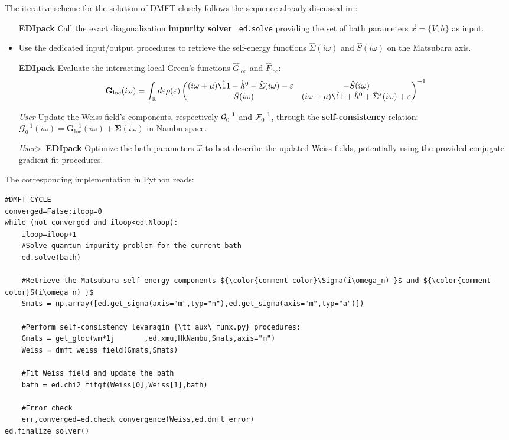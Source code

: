 \documentclass[edipack_sp.tex]{subfiles}
\begin{document}
The iterative scheme for the solution of DMFT closely follows the
sequence already discussed in :   
\begin{itemize}
\item[{\tiny {\bf EDIpack}}] Call the exact diagonalization {\bf impurity solver} {\tt
    ed.solve} providing the set of bath parameters $\vec{x}=\{V,h\}$  as input. 

\item Use the dedicated
  input/output \NAME procedures to retrieve the self-energy functions  
  $\hat{\Sigma}(i\omega)$ and $\hat{S}(i\omega)$ on the 
  Matsubara axis.
  
\item[{\tiny {\bf EDIpack}}]
  Evaluate the interacting local Green's functions $\hat{G}_\mathrm{loc}$ and
  $\hat{F}_\mathrm{loc}$:
  \begin{equation}
  {\mathbf G}_\mathrm{loc}(i\omega) =
  \int_\RRR d\e \rho(\e)
  \begin{pmatrix}
    (i\omega +\mu)\hat{\11} - \hat{h}^0 - \hat{\Sigma}(i\omega) -\e & -\hat{S}(i\omega) \\
    -\hat{S}(i\omega) & (i\omega +\mu)\hat{\11} + \hat{h}^0 +
    \hat{\Sigma}^*(i\omega) +\e\\
  \end{pmatrix}^{-1}
\end{equation}

\item[{\tiny {\it User}}] Update the Weiss field's components, respectively 
  ${\cal G}_0^{-1}$ and ${\cal F}_0^{-1}$, through the {\bf self-con\-sis\-ten\-cy}
  relation: $\mathbfcal{G}^{-1}_0(i\omega) = {\mathbf G}^{-1}_\mathrm{loc}(i\omega) +
  {\mathbf \Sigma}(i\omega)$ in Nambu space.
  
\item[{\tiny {\it User}}\textgreater\ {\tiny {\bf EDIpack}}] Optimize the bath parameters $\vec{x}$ to best describe the updated
    Weiss fields, potentially using the \NAME provided conjugate gradient  fit
    procedures.
  \end{itemize}
%
The corresponding implementation in Python reads:
\begin{lstlisting}[style=mypython,numbers=none,basicstyle={\scriptsize\ttfamily}]
#DMFT CYCLE
converged=False;iloop=0
while (not converged and iloop<ed.Nloop):
    iloop=iloop+1
    #Solve quantum impurity problem for the current bath
    ed.solve(bath)    

    #Retrieve the Matsubara self-energy components ${\color{comment-color}\Sigma(i\omega_n) }$ and ${\color{comment-color}S(i\omega_n) }$
    Smats = np.array([ed.get_sigma(axis="m",typ="n"),ed.get_sigma(axis="m",typ="a")])   
    
    #Perform self-consistency levaragin {\tt aux\_funx.py} procedures:
    Gmats = get_gloc(wm*1j       ,ed.xmu,HkNambu,Smats,axis="m")
    Weiss = dmft_weiss_field(Gmats,Smats)    
    
    #Fit Weiss field and update the bath
    bath = ed.chi2_fitgf(Weiss[0],Weiss[1],bath)

    #Error check
    err,converged=ed.check_convergence(Weiss,ed.dmft_error)
ed.finalize_solver()
\end{lstlisting}
\end{document}
